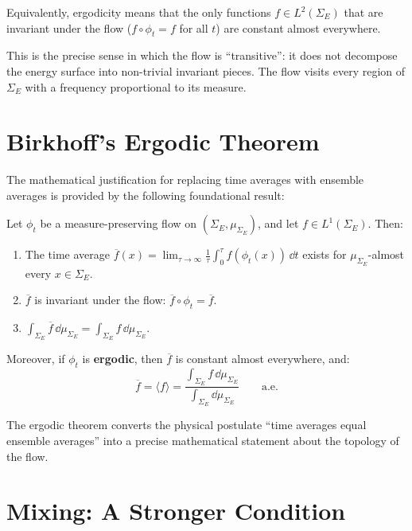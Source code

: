 Equivalently, ergodicity means that the only functions $f \in L^2(\Sigma_E)$ that are invariant under the flow ($f \circ \phi_t = f$ for all $t$) are constant almost everywhere.

\begin{remark}
This is the precise sense in which the flow is ``transitive'': it does not decompose the energy surface into non-trivial invariant pieces. The flow visits every region of $\Sigma_E$ with a frequency proportional to its measure.
\end{remark}

\section{Birkhoff's Ergodic Theorem}

The mathematical justification for replacing time averages with ensemble averages is provided by the following foundational result:

\begin{theorem}
Let $\phi_t$ be a measure-preserving flow on $(\Sigma_E, \mu_{\Sigma_E})$, and let $f \in L^1(\Sigma_E)$. Then:
\begin{enumerate}
\item The time average $\overline{f}(x) = \lim_{\tau \to \infty} \frac{1}{\tau}\int_0^\tau f(\phi_t(x))\,\dd t$ exists for $\mu_{\Sigma_E}$-almost every $x \in \Sigma_E$.
\item $\overline{f}$ is invariant under the flow: $\overline{f} \circ \phi_t = \overline{f}$.
\item $\int_{\Sigma_E} \overline{f}\,\dd\mu_{\Sigma_E} = \int_{\Sigma_E} f\,\dd\mu_{\Sigma_E}$.
\end{enumerate}
Moreover, if $\phi_t$ is \textbf{ergodic}, then $\overline{f}$ is constant almost everywhere, and:
\begin{equation}
\boxed{\overline{f} = \langle f \rangle = \frac{\int_{\Sigma_E} f\,\dd\mu_{\Sigma_E}}{\int_{\Sigma_E}\dd\mu_{\Sigma_E}} \qquad \text{a.e.}}
\end{equation}
\end{theorem}

The ergodic theorem converts the physical postulate ``time averages equal ensemble averages'' into a precise mathematical statement about the topology of the flow.

\section{Mixing: A Stronger Condition}

